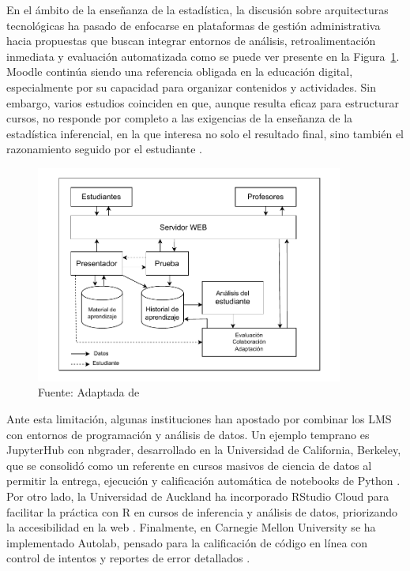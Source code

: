 \documentclass[letter,oneside,12pt,spanish]{report}
\begin{document}
En el ámbito de la enseñanza de la estadística, la discusión sobre arquitecturas tecnológicas ha pasado de enfocarse en plataformas de gestión administrativa hacia propuestas que buscan integrar entornos de análisis, retroalimentación inmediata y evaluación automatizada como se puede ver presente en la Figura~\ref{fig:architecture_E-learning}. Moodle continúa siendo una referencia obligada en la educación digital, especialmente por su capacidad para organizar contenidos y actividades. Sin embargo, varios estudios coinciden en que, aunque resulta eficaz para estructurar cursos, no responde por completo a las exigencias de la enseñanza de la estadística inferencial, en la que interesa no solo el resultado final, sino también el razonamiento seguido por el estudiante \parencite{Pacheco2025, Ndibalema2025}.

\begin{figure}[ht]
    \centering
    \includegraphics[width=0.9\textwidth]{Figs/Arquitectura_E-learning.pdf}
    \label{fig:architecture_E-learning}
    \\Fuente: Adaptada de \textcite{Mostefai2025}
\end{figure}


Ante esta limitación, algunas instituciones han apostado por combinar los LMS con entornos de programación y análisis de datos. Un ejemplo temprano es JupyterHub con nbgrader, desarrollado en la Universidad de California, Berkeley, que se consolidó como un referente en cursos masivos de ciencia de datos al permitir la entrega, ejecución y calificación automática de notebooks de Python \parencite{berkeley2018}. Por otro lado, la Universidad de Auckland ha incorporado RStudio Cloud para facilitar la práctica con R en cursos de inferencia y análisis de datos, priorizando la accesibilidad en la web \parencite{rubio2023}. Finalmente, en Carnegie Mellon University se ha implementado Autolab, pensado para la calificación de código en línea con control de intentos y reportes de error detallados \parencite{rubio2023}.
\end{document}
